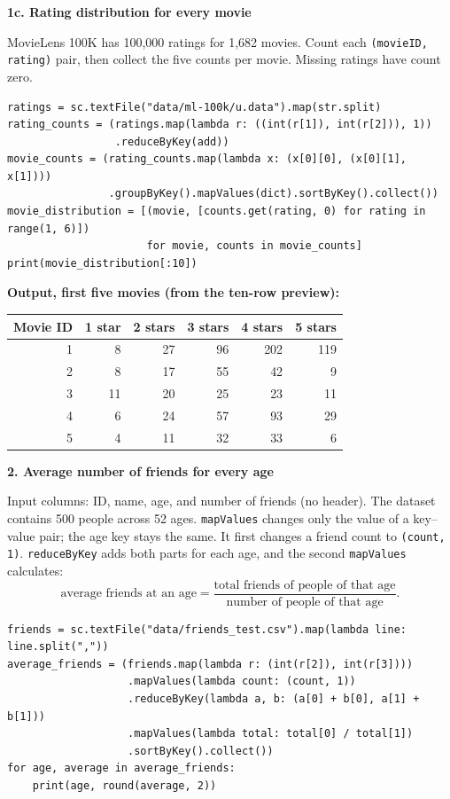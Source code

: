 \documentclass[10pt,a4paper]{article}
\newcommand{\task}[1]{\medskip\textbf{#1}\par}
\begin{document}
\task{1c. Rating distribution for every movie}
MovieLens 100K has 100,000 ratings for 1,682 movies.
Count each \texttt{(movieID, rating)} pair, then collect the five counts per movie.
Missing ratings have count zero.
\begin{lstlisting}
ratings = sc.textFile("data/ml-100k/u.data").map(str.split)
rating_counts = (ratings.map(lambda r: ((int(r[1]), int(r[2])), 1))
                 .reduceByKey(add))
movie_counts = (rating_counts.map(lambda x: (x[0][0], (x[0][1], x[1])))
                .groupByKey().mapValues(dict).sortByKey().collect())
movie_distribution = [(movie, [counts.get(rating, 0) for rating in range(1, 6)])
                      for movie, counts in movie_counts]
print(movie_distribution[:10])
\end{lstlisting}
\textbf{Output, first five movies (from the ten-row preview):}
\begin{center}
\begin{tabular}{rrrrrr}
\toprule
Movie ID & 1 star & 2 stars & 3 stars & 4 stars & 5 stars \\
\midrule
1 & 8 & 27 & 96 & 202 & 119 \\
2 & 8 & 17 & 55 & 42 & 9 \\
3 & 11 & 20 & 25 & 23 & 11 \\
4 & 6 & 24 & 57 & 93 & 29 \\
5 & 4 & 11 & 32 & 33 & 6 \\
\bottomrule
\end{tabular}
\end{center}
\newpage
\task{2. Average number of friends for every age}
Input columns: ID, name, age, and number of friends (no header).
The dataset contains 500 people across 52 ages.
\texttt{mapValues} changes only the value of a key--value pair; the age key stays the same.
It first changes a friend count to \texttt{(count, 1)}. \texttt{reduceByKey} adds
both parts for each age, and the second \texttt{mapValues} calculates:
\[
\text{average friends at an age} =
\frac{\text{total friends of people of that age}}{\text{number of people of that age}}.
\]
\begin{lstlisting}
friends = sc.textFile("data/friends_test.csv").map(lambda line: line.split(","))
average_friends = (friends.map(lambda r: (int(r[2]), int(r[3])))
                   .mapValues(lambda count: (count, 1))
                   .reduceByKey(lambda a, b: (a[0] + b[0], a[1] + b[1]))
                   .mapValues(lambda total: total[0] / total[1])
                   .sortByKey().collect())
for age, average in average_friends:
    print(age, round(average, 2))
\end{lstlisting}
\end{document}
